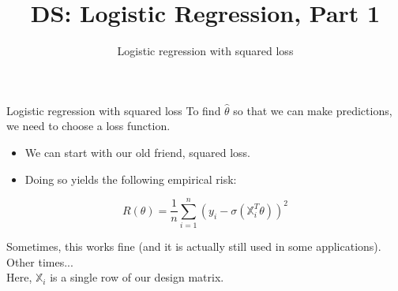 \documentclass[aspectratio=169]{../latex_main/tntbeamer}  %
\title[Introduction]{DS: Logistic Regression, Part 1}
\subtitle{Logistic regression with squared loss}
\begin{document}
	
	\maketitle
	\begin{frame}{Logistic regression with squared loss}
	    To find   $\hat{\theta}$   so that we can make predictions, we need to choose a loss function. 
        \begin{itemize}
            \item We can start with our old friend, squared loss.
            \item Doing so yields the following empirical risk:
        \end{itemize}
        \begin{equation*}
            R(\theta) = \frac{1}{n}\sum\limits_{i=1}^n(y_i-\sigma (\mathbb{X}_i^T\theta))^2
        \end{equation*}
        
        Sometimes, this works fine (and it is actually still used in some applications). Other times...\\
        \bigskip
        Here,    $\mathbb{X}_i$    is a single row of our design matrix.


	\end{frame}
	
\end{document}
